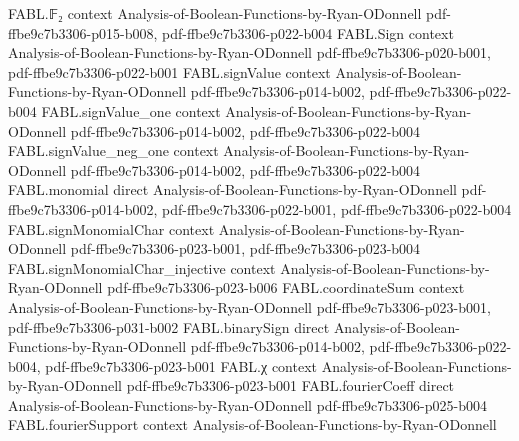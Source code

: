 \begin{theorem}
\label{FABL.restrictedFourierWeight_gt_quarter_of_mem_goldreichLevinRetained_of_stageAccurate}
\leanok
{}
\proofstep
  {FABL.𝔽₂}
  {context}
  {Analysis-of-Boolean-Functions-by-Ryan-ODonnell}
  {pdf-ffbe9c7b3306-p015-b008,
    pdf-ffbe9c7b3306-p022-b004}
\proofstep
  {FABL.Sign}
  {context}
  {Analysis-of-Boolean-Functions-by-Ryan-ODonnell}
  {pdf-ffbe9c7b3306-p020-b001,
    pdf-ffbe9c7b3306-p022-b001}
\proofstep
  {FABL.signValue}
  {context}
  {Analysis-of-Boolean-Functions-by-Ryan-ODonnell}
  {pdf-ffbe9c7b3306-p014-b002,
    pdf-ffbe9c7b3306-p022-b004}
\proofstep
  {FABL.signValue_one}
  {context}
  {Analysis-of-Boolean-Functions-by-Ryan-ODonnell}
  {pdf-ffbe9c7b3306-p014-b002,
    pdf-ffbe9c7b3306-p022-b004}
\proofstep
  {FABL.signValue_neg_one}
  {context}
  {Analysis-of-Boolean-Functions-by-Ryan-ODonnell}
  {pdf-ffbe9c7b3306-p014-b002,
    pdf-ffbe9c7b3306-p022-b004}
\proofstep
  {FABL.monomial}
  {direct}
  {Analysis-of-Boolean-Functions-by-Ryan-ODonnell}
  {pdf-ffbe9c7b3306-p014-b002,
    pdf-ffbe9c7b3306-p022-b001,
    pdf-ffbe9c7b3306-p022-b004}
\proofstep
  {FABL.signMonomialChar}
  {context}
  {Analysis-of-Boolean-Functions-by-Ryan-ODonnell}
  {pdf-ffbe9c7b3306-p023-b001,
    pdf-ffbe9c7b3306-p023-b004}
\proofstep
  {FABL.signMonomialChar_injective}
  {context}
  {Analysis-of-Boolean-Functions-by-Ryan-ODonnell}
  {pdf-ffbe9c7b3306-p023-b006}
\proofstep
  {FABL.coordinateSum}
  {context}
  {Analysis-of-Boolean-Functions-by-Ryan-ODonnell}
  {pdf-ffbe9c7b3306-p023-b001,
    pdf-ffbe9c7b3306-p031-b002}
\proofstep
  {FABL.binarySign}
  {direct}
  {Analysis-of-Boolean-Functions-by-Ryan-ODonnell}
  {pdf-ffbe9c7b3306-p014-b002,
    pdf-ffbe9c7b3306-p022-b004,
    pdf-ffbe9c7b3306-p023-b001}
\proofstep
  {FABL.χ}
  {context}
  {Analysis-of-Boolean-Functions-by-Ryan-ODonnell}
  {pdf-ffbe9c7b3306-p023-b001}
\proofstep
  {FABL.fourierCoeff}
  {direct}
  {Analysis-of-Boolean-Functions-by-Ryan-ODonnell}
  {pdf-ffbe9c7b3306-p025-b004}
\proofstep
  {FABL.fourierSupport}
  {context}
  {Analysis-of-Boolean-Functions-by-Ryan-ODonnell}

\end{theorem}
